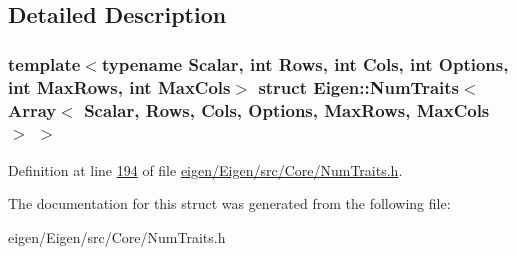 \subsection{Detailed Description}
\subsubsection*{template$<$typename Scalar, int Rows, int Cols, int Options, int Max\+Rows, int Max\+Cols$>$\newline
struct Eigen\+::\+Num\+Traits$<$ Array$<$ Scalar, Rows, Cols, Options, Max\+Rows, Max\+Cols $>$ $>$}



Definition at line \hyperlink{eigen_2_eigen_2src_2_core_2_num_traits_8h_source_l00194}{194} of file \hyperlink{eigen_2_eigen_2src_2_core_2_num_traits_8h_source}{eigen/\+Eigen/src/\+Core/\+Num\+Traits.\+h}.



The documentation for this struct was generated from the following file\+:\begin{DoxyCompactItemize}
\item 
eigen/\+Eigen/src/\+Core/\+Num\+Traits.\+h\end{DoxyCompactItemize}

